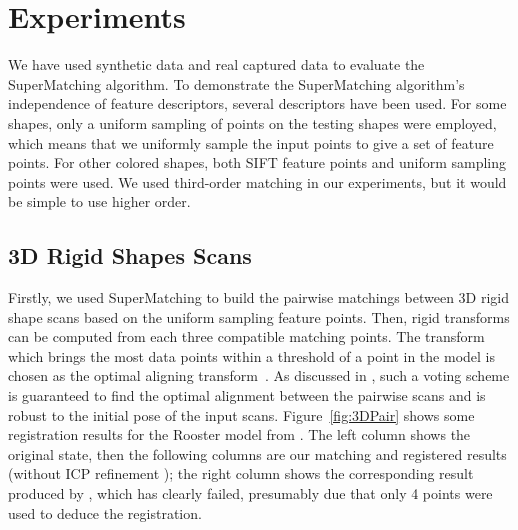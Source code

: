 \section{Experiments}
\label{sec:experiments}

We have used synthetic data and real captured data to evaluate the SuperMatching algorithm.
To demonstrate  the SuperMatching algorithm's independence of feature descriptors, several descriptors have been used.
For some shapes, only a uniform sampling of points on the testing shapes were employed,
which means that we uniformly sample the input points to give a set of feature points.
For other colored shapes, both SIFT feature points and uniform sampling points were used.
We used third-order matching in our experiments, but it would be simple to use higher order.

\subsection{3D Rigid Shapes Scans}
\label{subsec:3DRigid}

Firstly, we used SuperMatching to build the pairwise matchings between 3D rigid shape scans based on the uniform sampling feature points.
Then, rigid transforms can be computed from each three compatible matching points.
The transform which brings the most data points within a threshold of a point in the model is chosen as the optimal aligning transform~\cite{Huttenlocher90}.
As discussed in \cite{Gelfand05}, such a voting scheme is guaranteed to find the optimal alignment between the pairwise scans and is robust to the initial pose of the input scans.
Figure~\ref{fig:3DPair} shows some registration results for the Rooster model from \cite{Chuang09}. The left column shows the original state,
then the following columns are our matching and registered results (without  ICP refinement \cite{Besl92});
the right column shows the corresponding result produced by \cite{Aiger08}, which has clearly failed, presumably due that only 4 points were used to deduce the registration.

